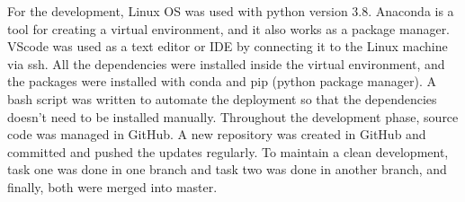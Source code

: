 \noindent For the development, Linux OS was used with python version 3.8. Anaconda is a tool for creating a virtual environment, and it also works as a package manager. VScode was used as a text editor or IDE by connecting it to the Linux machine via ssh. All the dependencies were installed inside the virtual environment, and the packages were installed with conda and pip (python package manager). A bash script was written to automate the deployment so that the dependencies doesn’t need to be installed manually. Throughout the development phase, source code was managed in GitHub. A new repository was created in GitHub and committed and pushed the updates regularly. To maintain a clean development, task one was done in one branch and task two was done in another branch, and finally, both were merged into master.\newline
\newpage
